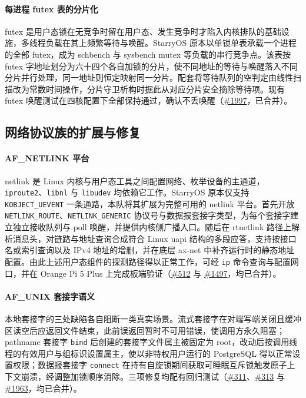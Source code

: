 \paragraph{每进程 futex 表的分片化}
futex 是用户态锁在无竞争时留在用户态、发生竞争时才陷入内核排队的基础设施，多线程负载在其上频繁等待与唤醒。StarryOS 原本以单锁单表承载一个进程的全部 futex，成为 schbench 与 sysbench mutex 等负载的串行竞争点。该表按 futex 字地址划分为六十四个各自加锁的分片，使不同地址的等待与唤醒落入不同分片并行处理，同一地址则恒定映射同一分片。配套将等待队列的空判定由线性扫描改为常数时间操作，分片守卫析构时据此从对应分片安全摘除等待项。现有 futex 唤醒测试在四核配置下全部保持通过，确认不丢唤醒（\href{https://github.com/rcore-os/tgoskits/pull/1997}{\#1997}，已合并）。

\subsection{网络协议族的扩展与修复}

\paragraph{AF\_NETLINK 平台}
netlink 是 Linux 内核与用户态工具之间配置网络、枚举设备的主通道，\texttt{iproute2}、\texttt{libnl} 与 \texttt{libudev} 均依赖它工作。StarryOS 原本仅支持 \texttt{KOBJECT\_UEVENT} 一条通路，本队将其扩展为完整可用的 netlink 平台。首先开放 \texttt{NETLINK\_ROUTE}、\texttt{NETLINK\_GENERIC} 协议号与数据报套接字类型，为每个套接字建立独立接收队列与 poll 唤醒，并提供内核侧广播入口。随后在 rtnetlink 路径上解析消息头，对链路与地址查询合成符合 Linux uapi 结构的多段应答，支持按接口名或索引查询以及 IPv4 地址的增删，并在底层 ax-net 中补齐运行时的静态地址配置。由此上述用户态组件的探测路径得以正常工作，可经 \texttt{ip} 命令查询与配置网口，并在 Orange Pi 5 Plus 上完成板端验证（\href{https://github.com/rcore-os/tgoskits/pull/512}{\#512} 与 \href{https://github.com/rcore-os/tgoskits/pull/1497}{\#1497}，均已合并）。

\paragraph{AF\_UNIX 套接字语义}
本地套接字的三处缺陷各自阻断一类真实场景。流式套接字在对端写端关闭且缓冲区读空后应返回文件结束，此前误返回暂时不可用错误，使调用方永久阻塞；pathname 套接字 \texttt{bind} 后创建的套接字文件属主被固定为 root，改动后按调用线程的有效用户与组标识设置属主，使以非特权用户运行的 PostgreSQL 得以正常设置权限；数据报套接字 \texttt{connect} 在持有自旋锁期间获取可睡眠互斥锁触发原子上下文崩溃，经调整加锁顺序消除。三项修复均配有回归测试（\href{https://github.com/rcore-os/tgoskits/pull/311}{\#311}、\href{https://github.com/rcore-os/tgoskits/pull/313}{\#313} 与 \href{https://github.com/rcore-os/tgoskits/pull/1963}{\#1963}，均已合并）。

